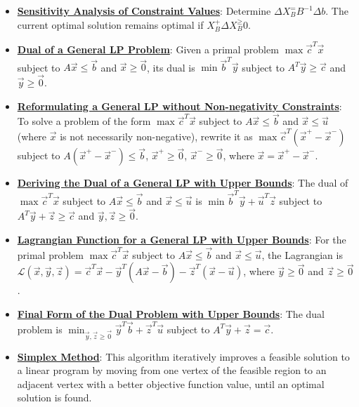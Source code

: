 \documentclass{article}%
\begin{document}
\begin{itemize}[leftmargin=*]
\item \href{https://www.math.purdue.edu/~yipn/421/2024-09-26-Sensitivity.pdf#page=11}{\textbf{Sensitivity Analysis of Constraint Values}}: Determine $\Delta X_B^ = B^{-1}\Delta b$. The current optimal solution remains optimal if $X_B^ + \Delta X_B^ \ge 0$.%
\item \href{https://www.math.purdue.edu/~yipn/421/2024-10-01-DualGeneralLP.pdf#page=1}{\textbf{Dual of a General LP Problem}}: Given a primal problem $\max \vec{c}^T\vec{x}$ subject to $A\vec{x} \le \vec{b}$ and $\vec{x} \ge \vec{0}$, its dual is $\min \vec{b}^T\vec{y}$ subject to $A^T\vec{y} \ge \vec{c}$ and $\vec{y} \ge \vec{0}$.%
\item \href{https://www.math.purdue.edu/~yipn/421/2024-10-01-DualGeneralLP.pdf#page=2}{\textbf{Reformulating a General LP without Non{-}negativity Constraints}}: To solve a problem of the form $\max \vec{c}^T\vec{x}$ subject to $A\vec{x} \le \vec{b}$ and $\vec{x} \le \vec{u}$ (where $\vec{x}$ is not necessarily non-negative), rewrite it as $\max \vec{c}^T(\vec{x}^+ - \vec{x}^-)$ subject to $A(\vec{x}^+ - \vec{x}^-) \le \vec{b}$, $\vec{x}^+ \ge \vec{0}$, $\vec{x}^- \ge \vec{0}$, where $\vec{x} = \vec{x}^+ - \vec{x}^-$.%
\item \href{https://www.math.purdue.edu/~yipn/421/2024-10-01-DualGeneralLP.pdf#page=3}{\textbf{Deriving the Dual of a General LP with Upper Bounds}}: The dual of $\max \vec{c}^T\vec{x}$ subject to $A\vec{x} \le \vec{b}$ and $\vec{x} \le \vec{u}$ is $\min \vec{b}^T\vec{y} + \vec{u}^T\vec{z}$ subject to $A^T\vec{y} + \vec{z} \ge \vec{c}$ and $\vec{y}, \vec{z} \ge \vec{0}$.%
\item \href{https://www.math.purdue.edu/~yipn/421/2024-10-01-DualGeneralLP.pdf#page=4}{\textbf{Lagrangian Function for a General LP with Upper Bounds}}: For the primal problem $\max \vec{c}^T\vec{x}$ subject to $A\vec{x} \le \vec{b}$ and $\vec{x} \le \vec{u}$, the Lagrangian is $\mathcal{L}(\vec{x}, \vec{y}, \vec{z}) = \vec{c}^T\vec{x} - \vec{y}^T(A\vec{x} - \vec{b}) - \vec{z}^T(\vec{x} - \vec{u})$, where $\vec{y} \ge \vec{0}$ and $\vec{z} \ge \vec{0}$.%
\item \href{https://www.math.purdue.edu/~yipn/421/2024-10-01-DualGeneralLP.pdf#page=7}{\textbf{Final Form of the Dual Problem with Upper Bounds}}: The dual problem is $\min_{\vec{y}, \vec{z} \ge \vec{0}} \vec{y}^T\vec{b} + \vec{z}^T\vec{u}$ subject to $A^T\vec{y} + \vec{z} = \vec{c}$.%
\item \href{https://www.math.purdue.edu/~yipn/421/2024-10-01-SensitivityDuality.pdf#page=4}{\textbf{Simplex Method}}: This algorithm iteratively improves a feasible solution to a linear program by moving from one vertex of the feasible region to an adjacent vertex with a better objective function value, until an optimal solution is found.%

\end{itemize}
\end{document}
